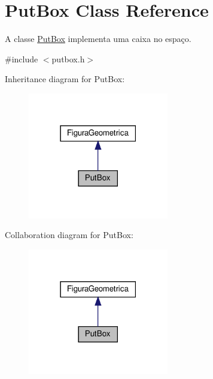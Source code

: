 \hypertarget{class_put_box}{}\section{Put\+Box Class Reference}
\label{class_put_box}


A classe \hyperlink{class_put_box}{Put\+Box} implementa uma caixa no espaço.  




{\ttfamily \#include $<$putbox.\+h$>$}



Inheritance diagram for Put\+Box\+:
\nopagebreak
\begin{figure}[H]
\begin{center}
\leavevmode
\includegraphics[width=174pt]{class_put_box__inherit__graph}
\end{center}
\end{figure}


Collaboration diagram for Put\+Box\+:
\nopagebreak
\begin{figure}[H]
\begin{center}
\leavevmode
\includegraphics[width=174pt]{class_put_box__coll__graph}
\end{center}
\end{figure}
